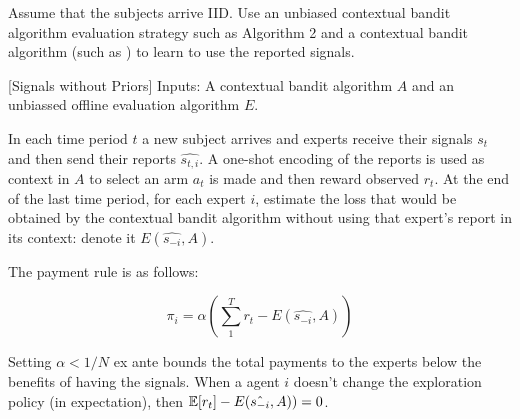 


Assume that the subjects arrive IID. Use an unbiased contextual bandit algorithm evaluation strategy such as \cite{li2011unbiased}  Algorithm 2 and a contextual bandit algorithm (such as \cite{syrgkanis2016efficient}) to learn to use the reported signals. %







\begin{mech}\label{mech:bandit}[Signals without Priors]
Inputs: A contextual bandit algorithm $A$ and an unbiassed offline evaluation algorithm $E$.

In each time period $t$ a new subject arrives and experts receive their signals $s_t$ and then send their reports $\hat{s_{t,i}}$. 
A one-shot encoding of the reports is used as context in $A$ to select an arm $a_t$ is made and then reward observed $r_t$.
At the end of the last time period, for each expert $i$, estimate the loss that would be obtained by the contextual bandit algorithm without using that expert's report in its context: denote it $E(\hat{s_{-i}},A)$.
 
The payment rule is as follows:

\[
    \pi_i =  \alpha (\sum_1^T r_t -  E(\hat{s_{-i}},A))
\]




\end{mech}


Setting $\alpha<1/N$ ex ante bounds the total payments to the experts below the benefits of having the signals.
When a agent $i$ doesn't change the exploration policy (in expectation), then $ \operatorname*{\mathbb E}[r_t] -  E(\hat{s_{-i}},A)) =0  $.




